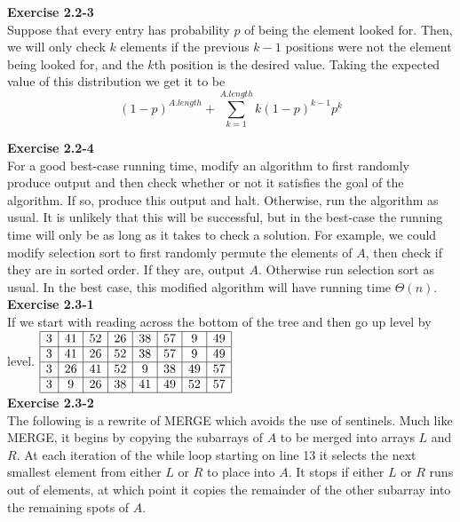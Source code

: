 \documentclass{article}
\begin{document}
\noindent\textbf{ Exercise 2.2-3}\\

Suppose that every entry has probability $p$ of being the element looked for. Then, we will only check $k$ elements if the previous $k-1$ positions were not the element being looked for, and the $k$th position is the desired value. Taking the expected value of this distribution we get it to be
\[
(1-p)^{A.length} + \sum_{k=1}^{A.length} k(1-p)^{k-1}p^k
\]

\noindent\textbf{Exercise 2.2-4}\\

For a good best-case running time, modify an algorithm to first randomly produce output and then check whether or not it satisfies the goal of the algorithm.  If so, produce this output and halt.  Otherwise, run the algorithm as usual.  It is unlikely that this will be successful, but in the best-case the running time will only be as long as it takes to check a solution.  For example, we could modify selection sort to first randomly permute the elements of $A$, then check if they are in sorted order.  If they are, output $A$.  Otherwise run selection sort as usual.  In the best case, this modified algorithm will have running time $\Theta(n)$. \\

\noindent\textbf{Exercise 2.3-1}\\

If we start with reading across the bottom of the tree and then go up level by level.
$
\begin{array}{|c|c|c|c|c|c|c|c|}
\hline
3&41&52&26&38&57&9&49\\
\hline
3&41&26&52&38&57&9&49\\
\hline
3&26&41&52&9&38&49&57\\
\hline
3&9&26&38&41&49&52&57\\
\hline
\end{array}
$\\

\noindent\textbf{Exercise 2.3-2}\\

The following is a rewrite of MERGE which avoids the use of sentinels.  Much like MERGE, it begins by copying the subarrays of $A$ to be merged into arrays $L$ and $R$.  At each iteration of the while loop starting on line 13 it selects the next smallest element from either $L$ or $R$ to place into $A$.  It stops if either $L$ or $R$ runs out of elements, at which point it copies the remainder of the other subarray into the remaining spots of $A$.  \\
\end{document}
